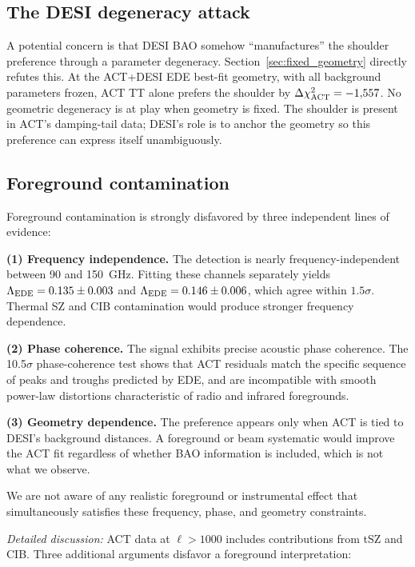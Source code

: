 \documentclass[twocolumn,showpacs,preprintnumbers,amsmath,amssymb,prd]{revtex4-2}
\begin{document}
\subsection{The DESI degeneracy attack}

A potential concern is that DESI BAO somehow ``manufactures'' the shoulder 
preference through a parameter degeneracy. Section~\ref{sec:fixed_geometry} 
directly refutes this. At the ACT+DESI EDE best-fit geometry, with all 
background parameters frozen, ACT TT alone prefers the shoulder by 
$\Delta\chi^2_{\rm ACT} = -1{,}557$. No geometric degeneracy is at play 
when geometry is fixed. The shoulder is present in ACT's damping-tail 
data; DESI's role is to anchor the geometry so this preference can 
express itself unambiguously.

\subsection{Foreground contamination}

Foreground contamination is strongly disfavored by three independent 
lines of evidence:

\textbf{(1) Frequency independence.} The detection is nearly 
frequency-independent between 90 and 150~GHz. Fitting these channels 
separately yields $\Lambda_{\rm EDE} = 0.135 \pm 0.003$ and 
$\Lambda_{\rm EDE} = 0.146 \pm 0.006$, which agree within $1.5\sigma$. 
Thermal SZ and CIB contamination would produce stronger frequency dependence.

\textbf{(2) Phase coherence.} The signal exhibits precise acoustic 
phase coherence. The 10.5$\sigma$ phase-coherence test shows that ACT 
residuals match the specific sequence of peaks and troughs predicted 
by EDE, and are incompatible with smooth power-law distortions 
characteristic of radio and infrared foregrounds.

\textbf{(3) Geometry dependence.} The preference appears only when 
ACT is tied to DESI's background distances. A foreground or beam 
systematic would improve the ACT fit regardless of whether BAO 
information is included, which is not what we observe.

We are not aware of any realistic foreground or instrumental effect 
that simultaneously satisfies these frequency, phase, and geometry 
constraints.

\vspace{0.5em}
\noindent\textit{Detailed discussion:} ACT data at $\ell > 1000$ 
includes contributions from tSZ and CIB. Three additional arguments 
disfavor a foreground interpretation:
\end{document}
